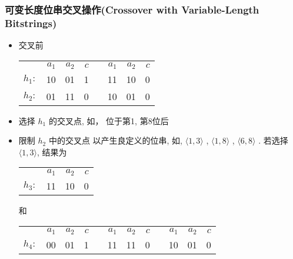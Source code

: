 \documentclass{beamer}
\begin{document}
\begin{frame}
\frametitle{可变长度位串交叉操作(Crossover with Variable-Length Bitstrings)}
\label{sec-4-2}


\begin{itemize}
\item 交叉前

\begin{center}
\begin{tabular}{lrrrlrrr}
           &  $a_{1}$  &  $a_{2}$  &  $c$  &     &  $a_{1}$  &  $a_{2}$  &  $c$  \\
 $h_{1}:$  &       10  &       01  &    1  &     &       11  &       10  &    0  \\
 $h_{2}:$  &       01  &       11  &    0  &     &       10  &       01  &    0  \\
\end{tabular}
\end{center}


\item 选择 $h_1$ 的交叉点, 如， 位于第1, 第8位后
\item 限制 $h_2$ 中的交叉点 以产生良定义的位串, 如, $\langle 1,3 \rangle$ , $\langle 1,8 \rangle$ , $\langle 6,8 \rangle$ .
  若选择 $\langle 1,3 \rangle$, 结果为

\begin{center}
\begin{tabular}{lrrr}
           &  $a_{1}$  &  $a_{2}$  &  $c$  \\
 $h_{3}:$  &       11  &       10  &    0  \\
\end{tabular}
\end{center}


  和

\begin{center}
\begin{tabular}{lrrrlrrrlrrr}
           &  $a_{1}$  &  $a_{2}$  &  $c$  &     &  $a_{1}$  &  $a_{2}$  &  $c$  &     &  $a_{1}$  &  $a_{2}$  &  $c$  \\
 $h_{4}:$  &       00  &       01  &    1  &     &       11  &       11  &    0  &     &       10  &       01  &    0  \\
\end{tabular}
\end{center}


\end{itemize}
\end{frame}
\end{document}
